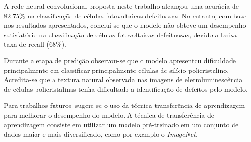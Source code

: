\documentclass[conference]{IEEEtran}
\begin{document}
A rede neural convolucional proposta neste trabalho alcançou uma acurácia de
82.75\% na classificação de células fotovoltaicas defeituosas. No entanto,
com base nos resultados apresentados, conclui-se que o modelo não obteve um
desempenho satisfatório na classificação de células fotovoltaicas
defeituosas, devido a baixa taxa de recall (68\%).

Durante a etapa de predição observou-se que o modelo apresentou dificuldade
principalmente em classificar principalmente células de silício policristalino.
Acredita-se que a textura natural observada nas imagens de
eletroluminescência de células policristalinas tenha dificultado a
identificação de defeitos pelo modelo.

Para trabalhos futuros, sugere-se o uso da técnica transferência de
aprendizagem para melhorar o desempenho do modelo. A técnica de transferência
de aprendizagem consiste em utilizar um modelo pré-treinado em um conjunto de
dados maior e mais diversificado, como por exemplo o \textit{ImageNet}.



\end{document}
